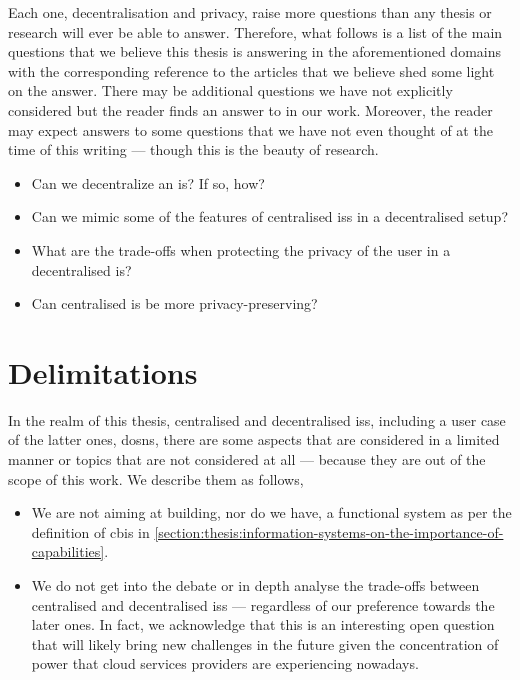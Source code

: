 Each one, decentralisation and privacy, raise more questions than any thesis or 
research will ever be able to answer. Therefore, what follows is a list of the main 
questions that we believe this thesis is answering in the aforementioned domains with 
the corresponding reference to the articles that we believe shed some light on the 
answer. There may be additional questions we have not explicitly considered but 
the reader finds an answer to in our work. Moreover, the reader may expect answers 
to some questions that we have not even thought of at the time of this writing --- 
though this is the beauty of research.

\begin{itemize}
    \item Can we decentralize an \ac{is}? If so, how?\\
    \item Can we mimic some of the features of centralised \acp{is} in a decentralised setup?\\
    \item What are the trade-offs when protecting the privacy of the user in a decentralised \ac{is}?\\
    \item Can centralised \ac{is} be more privacy-preserving?\\
\end{itemize}

\section{Delimitations}
    \label{section:delimitations}
In the realm of this thesis, centralised and decentralised \acp{is}, including a 
user case of the latter ones, \acp{dosn}, there are some aspects that are considered 
in a limited manner or topics that are not considered at all --- because they are 
out of the scope of this work. We describe them as follows,

\begin{itemize}
    \item We are not aiming at building, nor do we have, a functional system as per 
    the definition of \ac{cbis} in \cref{section:thesis:information-systems-on-the-importance-of-capabilities}.

    \item We do not get into the debate or in depth analyse the trade-offs between 
    centralised and decentralised \acp{is} --- regardless of our preference towards 
    the later ones. In fact, we acknowledge that this is an interesting open question 
    that will likely bring new challenges in the future given the concentration 
    of power that cloud services providers are experiencing nowadays.
\end{itemize}

